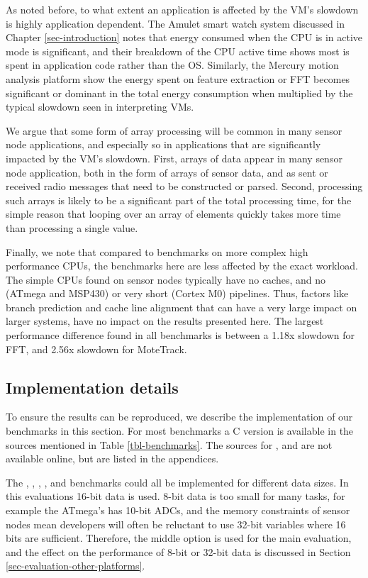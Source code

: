 As noted before, to what extent an application is affected by the VM's slowdown is highly application dependent. The Amulet smart watch system discussed in Chapter \ref{sec-introduction} notes that energy consumed when the CPU is in active mode is significant, and their breakdown of the CPU active time shows most is spent in application code rather than the OS. Similarly, the Mercury motion analysis platform show the energy spent on feature extraction or FFT becomes significant or dominant in the total energy consumption when multiplied by the typical slowdown seen in interpreting VMs.

We argue that some form of array processing will be common in many sensor node applications, and especially so in applications that are significantly impacted by the VM's slowdown. First, arrays of data appear in many sensor node application, both in the form of arrays of sensor data, and as sent or received radio messages that need to be constructed or parsed. Second, processing such arrays is likely to be a significant part of the total processing time, for the simple reason that looping over an array of elements quickly takes more time than processing a single value.

Finally, we note that compared to benchmarks on more complex high performance CPUs, the benchmarks here are less affected by the exact workload. The simple CPUs found on sensor nodes typically have no caches, and no (ATmega and MSP430) or very short (Cortex M0) pipelines. Thus, factors like branch prediction and cache line alignment that can have a very large impact on larger systems, have no impact on the results presented here. The largest performance difference found in all benchmarks is between a 1.18x slowdown for FFT, and 2.56x slowdown for MoteTrack.

\subsection{Implementation details}
To ensure the results can be reproduced, we describe the implementation of our benchmarks in this section. For most benchmarks a C version is available in the sources mentioned in Table \ref{tbl-benchmarks}. The sources for ,  and  are not available online, but are listed in the appendices.

The , , , , and  benchmarks could all be implemented for different data sizes. In this evaluations 16-bit data is used. 8-bit data is too small for many tasks, for example the ATmega's has 10-bit ADCs, and the memory constraints of sensor nodes mean developers will often be reluctant to use 32-bit variables where 16 bits are sufficient. Therefore, the middle option is used for the main evaluation, and the effect on the performance of 8-bit or 32-bit data is discussed in Section \ref{sec-evaluation-other-platforms}.


